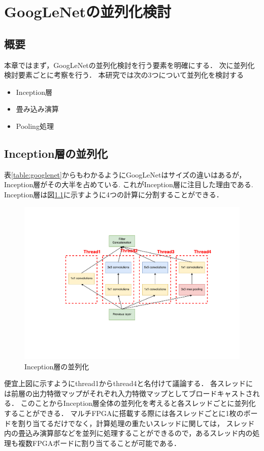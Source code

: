 \chapter{GoogLeNetの並列化検討}
{
\label{chap:parallel}

\section{概要}
本章ではまず，GoogLeNetの並列化検討を行う要素を明確にする．
次に並列化検討要素ごとに考察を行う．
本研究では次の3つについて並列化を検討する
\begin{itemize}
   \item Inception層 
   \item 畳み込み演算 
   \item Pooling処理 
\end{itemize}
\section{Inception層の並列化}
\label{sec:inception_para}
表\ref{table:googlenet}からもわかるようにGoogLeNetはサイズの違いはあるが，Inception層がその大半を占めている.
これがInception層に注目した理由である.
Inception層は図\ref{fig:para_inception}に示すように4つの計算に分割することができる．
\begin{figure}[h]
  \centering
  \includegraphics[width=12cm]{./chap5/fig/para_inception.pdf}
  \caption{Inception層の並列化}
  \label{fig:para_inception}
\end{figure}
便宜上図に示すようにthread1からthread4と名付けて議論する．
各スレッドには前層の出力特徴マップがそれぞれ入力特徴マップとしてブロードキャストされる．
このことからInception層全体の並列化を考えると各スレッドごとに並列化することができる．
マルチFPGAに搭載する際には各スレッドごとに1枚のボードを割り当てるだけでなく，計算処理の重たいスレッドに関しては，
スレッド内の畳込み演算部などを並列に処理することができるので，あるスレッド内の処理も複数FPGAボードに割り当てることが可能である．

}
